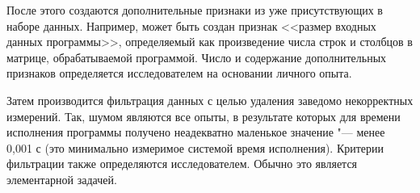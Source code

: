 После этого создаются дополнительные признаки из уже присутствующих в наборе данных. Например, может быть создан признак <<размер входных данных программы>>, определяемый как произведение числа строк и столбцов в матрице, обрабатываемой программой. Число и содержание дополнительных признаков определяется исследователем на основании личного опыта.

Затем производится фильтрация данных с целью удаления заведомо некорректных измерений. Так, шумом являются все опыты, в результате которых для времени исполнения программы получено неадекватно маленькое значение "--- менее 0,001 с (это минимально измеримое системой время исполнения). Критерии фильтрации также определяются исследователем. Обычно это является элементарной задачей.